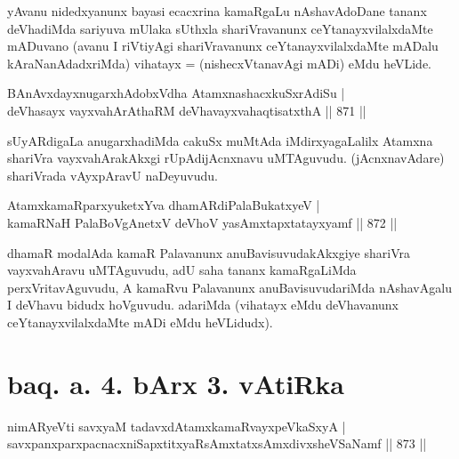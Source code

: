 \begin{artha}
yAvanu nidedxyanunx bayasi ecacxrina kamaRgaLu nAshavAdoDane tananx deVhadiMda sariyuva mUlaka sUthxla shariVravanunx ceYtanayxvilalxdaMte mADuvano (avanu I riVtiyAgi shariVravanunx ceYtanayxvilalxdaMte mADalu kAraNanAdadxriMda) vihatayx = (nishecxVtanavAgi mADi) eMdu heVLide.
\end{artha}


\begin{shl}
BAnAvxdayxnugarxhAdobxVdha AtamxnashacxkuSxrAdiSu | \\
deVhasayx vayxvahArAthaRM deVhavayxvahaqtisatxthA \hfill||  871 ||  
\end{shl}

\begin{artha}
sUyARdigaLa anugarxhadiMda cakuSx muMtAda iMdirxyagaLalilx Atamxna shariVra vayxvahArakAkxgi rUpAdijAcnxnavu uMTAguvudu. (jAcnxnavAdare) shariVrada vAyxpAravU naDeyuvudu.
\end{artha}


\begin{shl}
AtamxkamaRparxyuketxYva dhamARdiPalaBukatxyeV | \\
kamaRNaH PalaBoVgAnetxV deVhoV yasAmxtapxtatayxyamf \hfill||  872 ||  
\end{shl}

\begin{artha}
dhamaR modalAda kamaR Palavanunx anuBavisuvudakAkxgiye shariVra vayxvahAravu uMTAguvudu, adU saha tananx kamaRgaLiMda perxVritavAguvudu, A kamaRvu Palavanunx anuBavisuvudariMda nAshavAgalu I deVhavu bidudx hoVguvudu. adariMda (vihatayx eMdu deVhavanunx ceYtanayxvilalxdaMte mADi eMdu heVLidudx).
\end{artha}

\section*{baq. a. 4. bArx 3. vAtiRka}


\begin{shl}
nimARyeVti savxyaM tadavxdAtamxkamaRvayxpeVkaSxyA | \\
savxpanxparxpacnacxniSapxtitxyaRsAmxtatxsAmxdivxsheVSaNamf \hfill||  873 ||  
\end{shl}

